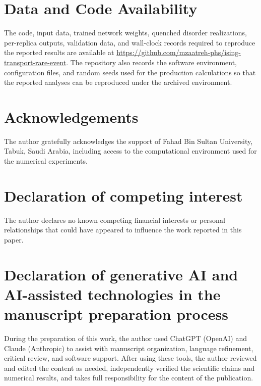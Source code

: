 \documentclass[a4paper,fleqn]{cas-sc}
\begin{document}
\section*{Data and Code Availability}
The code, input data, trained network weights, quenched disorder realizations, per-replica
outputs, validation data, and wall-clock records required to reproduce the reported results are
available at \url{https://github.com/mzaatreh-phs/ising-transport-rare-event}. The repository
also records the software environment, configuration files, and random seeds used for the
production calculations so that the reported analyses can be reproduced under the archived
environment.

\section*{Acknowledgements}
The author gratefully acknowledges the support of Fahad Bin Sultan University, Tabuk, Saudi
Arabia, including access to the computational environment used for the numerical experiments.

\printcredits

\section*{Declaration of competing interest}
The author declares no known competing financial interests or personal relationships that
could have appeared to influence the work reported in this paper.

\section*{Declaration of generative AI and AI-assisted technologies in the manuscript preparation process}
During the preparation of this work, the author used ChatGPT (OpenAI) and Claude (Anthropic)
to assist with manuscript organization, language refinement, critical review, and software
support. After using these tools, the author reviewed and edited the content as needed,
independently verified the scientific claims and numerical results, and takes full
responsibility for the content of the publication.
\end{document}

